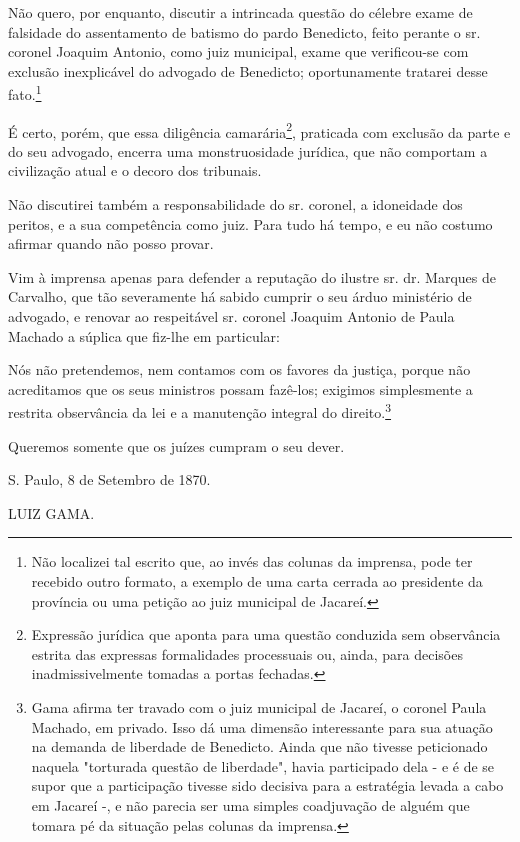 Não quero, por enquanto, discutir a intrincada questão do célebre exame
de falsidade do assentamento de batismo do pardo Benedicto, feito
perante o sr. coronel Joaquim Antonio, como juiz municipal, exame que
verificou-se com exclusão inexplicável do advogado de Benedicto;
oportunamente tratarei desse fato.\footnote{Não localizei tal escrito
  que, ao invés das colunas da imprensa, pode ter recebido outro
  formato, a exemplo de uma carta cerrada ao presidente da província ou
  uma petição ao juiz municipal de Jacareí.}

É certo, porém, que essa diligência camarária\footnote{Expressão
  jurídica que aponta para uma questão conduzida sem observância estrita
  das expressas formalidades processuais ou, ainda, para decisões
  inadmissivelmente tomadas a portas fechadas.}, praticada com exclusão
da parte e do seu advogado, encerra uma monstruosidade jurídica, que não
comportam a civilização atual e o decoro dos tribunais.

Não discutirei também a responsabilidade do sr. coronel, a idoneidade
dos peritos, e a sua competência como juiz. Para tudo há tempo, e eu não
costumo afirmar quando não posso provar.

Vim à imprensa apenas para defender a reputação do ilustre sr. dr.
Marques de Carvalho, que tão severamente há sabido cumprir o seu árduo
ministério de advogado, e renovar ao respeitável sr. coronel Joaquim
Antonio de Paula Machado a súplica que fiz-lhe em particular:

Nós não pretendemos, nem contamos com os favores da justiça, porque não
acreditamos que os seus ministros possam fazê-los; exigimos simplesmente
a restrita observância da lei e a manutenção integral do
direito.\footnote{Gama afirma ter travado com o juiz municipal de
  Jacareí, o coronel Paula Machado, em privado. Isso dá uma dimensão
  interessante para sua atuação na demanda de liberdade de Benedicto.
  Ainda que não tivesse peticionado naquela "torturada questão de
  liberdade", havia participado dela - e é de se supor que a
  participação tivesse sido decisiva para a estratégia levada a cabo em
  Jacareí -, e não parecia ser uma simples coadjuvação de alguém que
  tomara pé da situação pelas colunas da imprensa.}

Queremos somente que os
juízes cumpram o seu dever.

S. Paulo, 8 de Setembro de 1870.

LUIZ GAMA.

\pagebreak
\mbox{}\vfill
\thispagestyle{empty}

